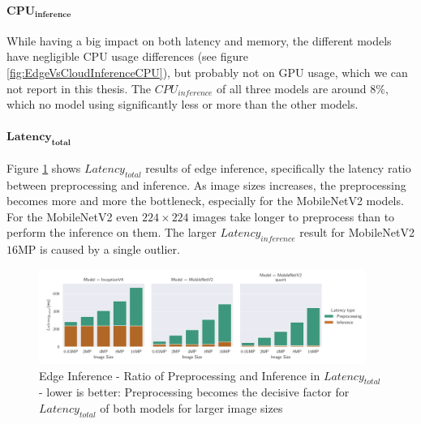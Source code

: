 \paragraph{$\mathbf{CPU_{inference}}$}
While having a big impact on both latency and memory, the different models have 
negligible CPU usage differences (see figure \ref{fig:EdgeVsCloudInferenceCPU}), but probably not on GPU usage, which we can not report in this thesis.
The $CPU_{inference}$ of all three models are around $8\%$, which no model using significantly less or more than the other models.




\paragraph{$\mathbf{Latency_{total}}$}
Figure \ref{fig:EdgeInferenceRatio} shows $Latency_{total}$ results of edge inference, specifically the latency ratio between preprocessing and inference.
As image sizes increases, the preprocessing becomes more and more the bottleneck, especially for the MobileNetV2 models.
For the MobileNetV2 even $224\times224$ images take longer to preprocess than to perform the inference on them. The larger $Latency_{inference}$ result for MobileNetV2 $16$MP is caused by a single outlier.
\begin{figure}[!htb]
\centering
\includegraphics[width=0.95\textwidth]{./Bilder/single_plots/edge_inference_plots/Edge_Preprocessing_+_Inference.pdf}
\caption[Edge Inference - Ratio of Preprocessing and Inference in $Latency_{total}$]{Edge Inference - Ratio of Preprocessing and Inference in $Latency_{total}$ - lower is better: Preprocessing becomes the decisive factor for $Latency_{total}$ of both models for larger image sizes}
\label{fig:EdgeInferenceRatio}
\end{figure}


